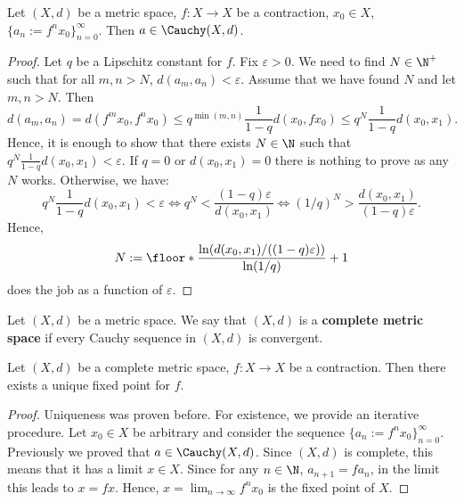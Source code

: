 \begin{proposition}
  Let
    $(X, d)$ be a metric space,
    $f \colon X \to X$ be a contraction,
    $x_0 \in X$,
    $\{a_n := f^n x_0\}_{n = 0}^\infty$.
  Then $a \in \Cauchy(X, d)$.
\end{proposition}
\begin{proof}
  Let $q$ be a Lipschitz constant for $f$.
  Fix $\varepsilon > 0$.
  We need to find $N \in \N^+$ such that
  for all $m, n > N$, $d(a_m, a_n) < \varepsilon$.
  Assume that we have found $N$ and let $m, n > N$.
  Then
  \begin{equation}
    d(a_m, a_n)
    = d(f^m x_0, f^n x_0)
    \leq q^{\min(m, n)} \frac{1}{1 - q} d(x_0, f x_0)
    \leq q^N \frac{1}{1 - q} d(x_0, x_1).
  \end{equation}
  Hence, it is enough to show that there exists $N \in \N$ such that
  $q^N \frac{1}{1 - q} d(x_0, x_1) < \varepsilon$.
  If $q = 0$ or $d(x_0, x_1) = 0$ there is nothing to prove as any $N$ works.
  Otherwise, we have:
  \begin{equation}
    q^N \frac{1}{1 - q} d(x_0, x_1) < \varepsilon
    \Leftrightarrow q^N < \frac{(1 - q) \varepsilon}{d(x_0, x_1)}
    \Leftrightarrow (1 / q)^N > \frac{d(x_0, x_1)}{(1 - q) \varepsilon}.
  \end{equation}
  Hence,
  \begin{equation}
    N
    := \floor*{\frac{\ln(d(x_0, x_1) / ((1 - q) \varepsilon))}{\ln(1 / q)}} + 1
  \end{equation}
  does the job as a function of $\varepsilon$.
\end{proof}
\begin{definition}
  Let $(X, d)$ be a metric space.
  We say that $(X, d)$ is a \textbf{complete metric space}
  if every Cauchy sequence in $(X, d)$ is convergent.
\end{definition}
\begin{theorem}
  Let
    $(X, d)$ be a complete metric space,
    $f \colon X \to X$ be a contraction.
  Then there exists a unique fixed point for $f$.
\end{theorem}
\begin{proof}
  Uniqueness was proven before.
  For existence, we provide an iterative procedure.
  Let $x_0 \in X$ be arbitrary and consider the sequence
  $\{a_n := f^n x_0\}_{n = 0}^\infty$.
  Previously we proved that $a \in \Cauchy(X, d)$.
  Since $(X, d)$ is complete, this means that it has a limit $x \in X$.
  Since for any $n \in \N$, $a_{n + 1} = f a_n$, in the limit this leads to
  $x = f x$.
  Hence, $x = \lim_{n \to \infty} f^n x_0$ is the fixed point of $X$.
\end{proof}
